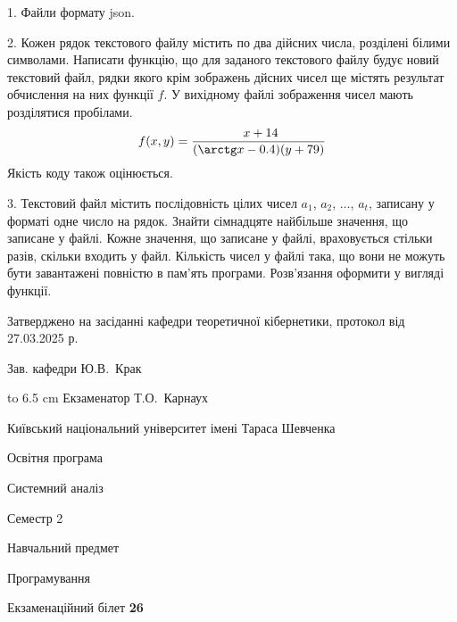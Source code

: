 \documentclass[12pt, ukrainian]{article}
\begin{document}
{%
1. Файли формату json.%
\par
\vspace{2mm}

2. Кожен рядок текстового файлу містить по два дійсних числа, розділені білими символами.
Написати функцію, що для заданого текстового файлу будує новий текстовий файл, рядки якого крім зображень дйсних чисел ще містять результат обчислення на них функції $f$. У вихідному файлі зображення чисел мають розділятися пробілами. 
$$f(x, y) =\frac{\ x + 14}{(\arctg x - 0.4) (y + 79)}$$ 
Якість коду також оцінюється.

\par
\vspace{2mm}

3. Текстовий файл містить послідовність цілих чисел $a_1$, $a_2$, $\ldots$, $a_t$, записану у форматі одне число на рядок. Знайти сімнадцяте найбільше значення, що записане у файлі. Кожне значення, що записане у файлі, враховується стільки разів, скільки входить у файл. Кількість чисел у файлі така, що вони не можуть бути завантажені повністю в пам'ять програми. Розв'язання оформити у вигляді функції.

}
{\smallskip\smallskip \begin {scriptsize} Затверджено на засіданні кафедри теоретичної кібернетики, протокол   від   27.03.2025 р.\par\smallskip\smallskip\smallskip\smallskip
{\parbox {6.5 cm} {Зав. кафедри \dotfill Ю.В.~Крак}}\hspace {0.7cm} {\hbox to 6.5 cm { Екзаменатор \dotfill Т.О.~Карнаух}} \end{scriptsize}}
\vspace{2.9cm}
{{\begin {scriptsize}\par
{ \center  Київський національний університет імені Тараса Шевченка \par}
{\parbox {5 cm}{Освітня програма \hfill}{\parbox {7 cm}{Системний аналіз\hfill}}\parbox {6 cm}{\hfill Семестр 2}}\par
{\parbox {5 cm} {Навчальний предмет \hfill}\parbox {7 cm}{Програмування \hfill}\parbox {6cm}{\hfill}\par}\vspace{-15pt} \end{scriptsize}}{\center Екзаменаційний білет \No \textbf { 26 }\par}}
\end{document}
